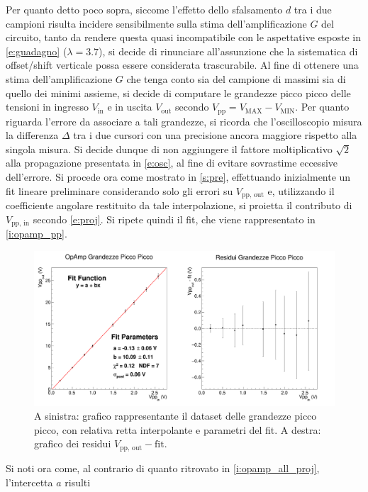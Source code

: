 \documentclass[a4paper,11pt]{article} %
\begin{document}
\noindent Per quanto detto poco sopra, siccome l'effetto dello sfalsamento $d$ tra i due campioni risulta incidere
sensibilmente sulla stima dell'amplificazione $G$ del circuito, tanto da rendere questa quasi incompatibile con le
aspettative esposte in \autoref{e:guadagno} ($\lambda = 3.7$), si decide di rinunciare all'assunzione che la sistematica
di offset/shift verticale possa essere considerata trascurabile. Al fine di ottenere una stima dell'amplificazione $G$
che tenga conto sia del campione di massimi sia di quello dei minimi assieme, si decide di computare le grandezze picco
picco delle tensioni in ingresso $V_{\text{in}}$ e in uscita $V_{\text{out}}$ secondo
$V_{\text{pp}}=V_{\text{MAX}}-V_{\text{MIN}}$. Per quanto riguarda l'errore da associare a tali grandezze, si ricorda
che l'oscilloscopio misura la differenza $\Delta$ tra i due cursori con una precisione ancora maggiore rispetto alla
singola misura. Si decide dunque di non aggiungere il fattore moltiplicativo $\sqrt{2}$ alla propagazione presentata in
\autoref{e:osc}, al fine di evitare sovrastime eccessive dell'errore. Si procede ora come mostrato in \autoref{s:pre},
effettuando inizialmente un fit lineare preliminare considerando solo gli errori su $V_{\text{pp, out}}$ e, utilizzando
il coefficiente angolare restituito da tale interpolazione, si proietta il contributo di $V_{\text{pp, in}}$  secondo
\autoref{e:proj}. Si ripete quindi il fit, che viene rappresentato in \autoref{i:opamp_pp}.
\begin{figure}[H]
	\centering
	\includegraphics[width=\linewidth]{../Plots/Report_Plots/opamp_plot_pp_projected.png}
	\caption{\small A sinistra: grafico rappresentante il dataset delle grandezze picco picco, 
	con relativa retta interpolante e parametri del fit. A destra: grafico dei residui $V_{\text{pp, out}}-\text{fit}$.}
	\label{i:opamp_pp}
\end{figure}
\noindent Si noti ora come, al contrario di quanto ritrovato in \autoref{i:opamp_all_proj}, l'intercetta $a$ risulti
\end{document}
